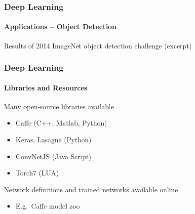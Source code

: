 \documentclass[xetex,professionalfont]{beamer}
\begin{document}

\begin{frame}[fragile]
\frametitle{Deep Learning}
\framesubtitle{Applications -- Object Detection}

Results of 2014 ImageNet object detection challenge (excerpt) %


\medskip
\begin{center}
\end{center}

\end{frame}


\begin{frame}
\frametitle{Deep Learning}
\framesubtitle{Libraries and Resources}

Many open-source libraries available
\begin{itemize}
    \item Caffe (C++, Matlab, Python)
    \item Keras, Lasagne (Python)
    \item ConvNetJS (Java Script)
    \item Torch7 (LUA)
\end{itemize}

\bigskip
Network definitions and trained networks available online
\begin{itemize}
    \item E.g.\ Caffe model zoo
\end{itemize}

\end{frame}
\end{document}
